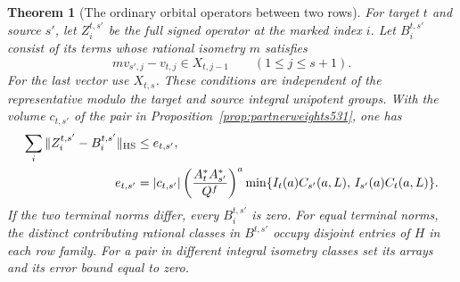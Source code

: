 \documentclass[a4paper,11pt]{article}
\newtheorem{theorem}[proposition]{Theorem}
\theoremstyle{definition}
\theoremstyle{remark}
\numberwithin{equation}{section}
\begin{document}
\begin{theorem}[The ordinary orbital operators between two rows]
\leavevmode\label{thm:mixedordinary541}
For target \(t\) and source \(s'\), let \(Z_i^{t,s'}\) be the
full signed operator at the marked index \(i\). Let
\(B_i^{t,s'}\) consist of its terms whose rational isometry
\(m\) satisfies
\[
        m v_{s',j}-v_{t,j}\in X_{t,j-1}
                          \qquad(1\le j\le s+1).
\]
For the last vector use \(X_{t,s}\). These conditions are
independent of the representative modulo the target and source
integral unipotent groups. With the volume \(c_{t,s'}\) of
the pair in Proposition~\ref{prop:partnerweights531}, one has
\[
 \begin{split}
 \sum_i\|Z_i^{t,s'}-B_i^{t,s'}\|_{\rm HS}
     &\le e_{t,s'},\\
 e_{t,s'}&=
 |c_{t,s'}|
  \left(\frac{A_t^* A_{s'}^*}{Q^f}\right)^a
  \min\{I_t(a)C_{s'}(a,L),\, I_{s'}(a)C_t(a,L)\}.
 \end{split}
\]
If the two terminal norms differ, every \(B_i^{t,s'}\) is zero.
For equal terminal norms, the distinct contributing rational
classes in \(B^{t,s'}\) occupy disjoint entries of \(H\) in
each row family. For a pair in different integral isometry
classes set its arrays and its error bound equal to zero.
\end{theorem}
\end{document}
